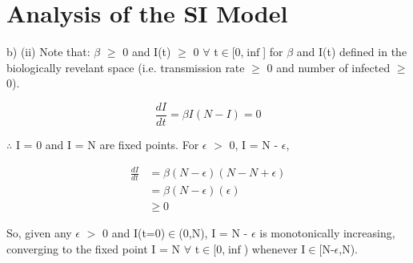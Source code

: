\documentclass[12pt]{article}
\begin{document}
\section{Analysis of the SI Model}

b) (ii) Note that: $\beta$ $\geq$ 0 and I(t) $\geq$ 0 $\forall$ t$\in$[0,$\inf$] for $\beta$ and I(t) defined in the biologically revelant space (i.e. transmission rate $\geq$ 0 and number of infected $\geq$ 0).

\begin{equation}
\frac{dI}{dt} = \beta I(N-I) = 0 
\end{equation}

$\therefore$ I = 0 and I = N are fixed points. For $\epsilon$ $>$ 0, I = N - $\epsilon$,

\begin{align}
\frac{dI}{dt} &= \beta (N-\epsilon)(N-N+\epsilon) \\
&= \beta (N-\epsilon)(\epsilon) \\
&\geq 0
\end{align}

So, given any $\epsilon$ $>$ 0 and I(t=0)$\in$(0,N), I = N - $\epsilon$ is monotonically increasing, converging to the fixed point I = N $\forall$ t$\in$[0,$\inf$) whenever I$\in$[N-$\epsilon$,N).
\end{document}
